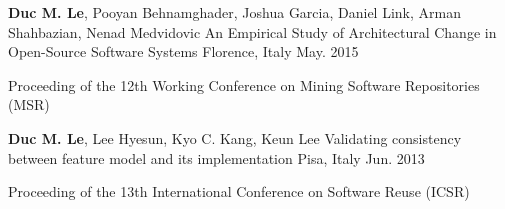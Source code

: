 \begin{cventries}
\cventry
{\textbf{Duc M. Le}, Pooyan Behnamghader, Joshua Garcia, Daniel	Link, Arman	Shahbazian, Nenad Medvidovic} %
{An Empirical Study of Architectural Change in Open-Source Software Systems} %
{Florence, Italy} %
{May. 2015} %
{
	\begin{cvitems} %
		\item Proceeding of the 12th Working Conference on Mining Software Repositories (MSR)
	\end{cvitems}
}

\cventry
{\textbf{Duc M. Le}, Lee Hyesun, Kyo C. Kang, Keun Lee } %
{Validating consistency between feature model and its implementation} %
{Pisa, Italy} %
{Jun. 2013} %
{
	\begin{cvitems} %
		\item Proceeding of the 13th International Conference on Software Reuse (ICSR)
	\end{cvitems}
}

\end{cventries}
